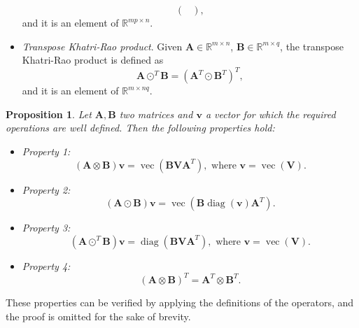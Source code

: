 \documentclass[10pt,titlepage]{article}
\numberwithin{equation}{section}
\numberwithin{figure}{section}
\newtheorem{prop}{Proposition}
\DeclareMathOperator{\myvec}{vec}
\DeclareMathOperator{\diag}{diag}
\begin{document}
\begin{itemize}
\begin{equation}
\begin{pmatrix}
	\end{pmatrix},
	\label{eqn:khatri_mat}
	\end{equation}
	and it is an element of $\mathbb{R}^{mp \times n}$.
\item \textit{Transpose Khatri-Rao product}. 
	Given $\mathbf{A} \in \mathbb{R}^{m \times n}$, $\mathbf{B} \in \mathbb{R}^{m \times q}$, the transpose Khatri-Rao product is defined as
	\begin{equation}
	\mathbf{A} \odot^T \mathbf{B}=(\mathbf{A}^T \odot \mathbf{B}^T)^T,
	\label{eqn:khatriT}
	\end{equation}
	and it is an element of $\mathbb{R}^{m \times nq}$.
\end{itemize}

\begin{prop}
	Let $\mathbf{A},\mathbf{B}$ two matrices and $\mathbf{v}$ a vector for which the required operations are well defined. Then the following properties hold:
	\begin{itemize}
		\item Property 1:
		\begin{equation}
		(\mathbf{A} \otimes \mathbf{B})\mathbf{v}=\myvec(\mathbf{B} \mathbf{V} \mathbf{A}^T), \text{ where } \mathbf{v}=\myvec(\mathbf{V}).
		\label{eqn:prop1}
		\end{equation}
		\item Property 2:
		\begin{equation}
		(\mathbf{A} \odot \mathbf{B})\mathbf{v}=\myvec (\mathbf{B} \diag(\mathbf{v}) \mathbf{A}^T).
		\label{eqn:prop2}
		\end{equation}
		\item Property 3:
		\begin{equation}
		(\mathbf{A} \odot^T \mathbf{B})\mathbf{v}=\diag (\mathbf{B} \mathbf{V} \mathbf{A}^T), \text{ where } \mathbf{v}=\myvec(\mathbf{V}). 
		\label{eqn:prop3}
		\end{equation}
		\item Property 4:
		\begin{equation}
		(\mathbf{A} \otimes \mathbf{B})^T=\mathbf{A}^T \otimes \mathbf{B}^T.
		\label{eqn:prop4}
		\end{equation}
	\end{itemize}
\end{prop}
These properties can be verified by applying the definitions of the operators, and the proof is omitted for the sake of brevity.
\end{document}

